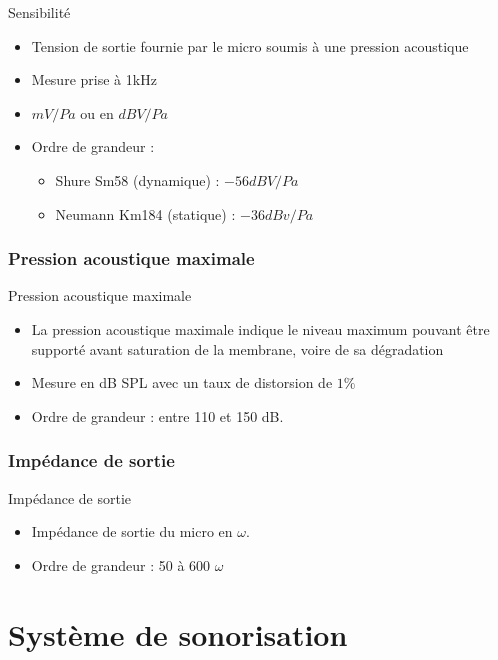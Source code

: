 \documentclass[aspectratio=169]{beamer}
\begin{document}
\begin{frame}{Sensibilité}
\begin{itemize}
	\item Tension de sortie fournie par le micro soumis à une pression acoustique
	\item Mesure prise à 1kHz
	\item $mV/Pa$ ou en $dBV/Pa$
	\item Ordre de grandeur : 
\begin{itemize}
	\item Shure Sm58 (dynamique) : $-56dBV/Pa$
	\item Neumann Km184 (statique) : $-36dBv/Pa$
\end{itemize}
\end{itemize}
\end{frame}

\subsubsection{Pression acoustique maximale}
\begin{frame}{Pression acoustique maximale}
\begin{itemize}
	\item La pression acoustique maximale indique le niveau maximum pouvant être supporté avant saturation de la membrane, voire de sa dégradation
	\item Mesure en dB SPL avec un taux de distorsion de $1\%$
	\item Ordre de grandeur : entre 110 et 150 dB.
\end{itemize}
\end{frame}

\subsubsection{Impédance de sortie}

\begin{frame}{Impédance de sortie}
\begin{itemize}
	\item Impédance de sortie du micro en $\omega$.
	\item Ordre de grandeur : 50 à 600 $\omega$
\end{itemize}
\end{frame}


\section{Système de sonorisation}
\end{document}
